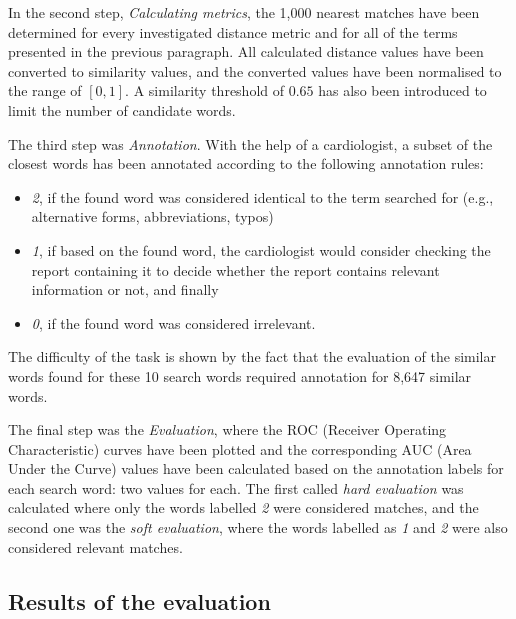 In the second step, \textit{Calculating metrics}, the 1,000 nearest matches have been determined for every investigated distance metric and for all of the terms presented in the previous paragraph. All calculated distance values have been converted to similarity values, and the converted values have been normalised to the range of $[0,1]$. A similarity threshold of $0.65$ has also been introduced to limit the number of candidate words.



The third step was \textit{Annotation}. With the help of a cardiologist, a subset of the closest words has been annotated according to the following annotation rules:
\begin{itemize}
	\item \textit{2}, if the found word was considered identical to the term searched for (e.g., alternative forms, abbreviations, typos)
	\item \textit{1}, if based on the found word, the cardiologist would consider checking the report containing it to decide whether the report contains relevant information or not, and finally
	\item \textit{0}, if the found word was considered irrelevant.
\end{itemize}
The difficulty of the task is shown by the fact that the evaluation of the similar words found for these 10 search words required annotation for 8,647 similar words.

The final step was the \textit{Evaluation}, where the ROC (Receiver Operating Characteristic) curves have been plotted and the corresponding AUC (Area Under the Curve) values have been calculated based on the annotation labels for each search word: two values for each. The first called \textit{hard evaluation} was calculated where only the words labelled \textit{2} were considered matches, and the second one was the \textit{soft evaluation}, where the words labelled as \textit{1} and \textit{2} were also considered relevant matches.

\subsection{Results of the evaluation}

